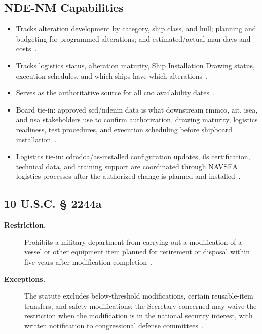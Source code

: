 \documentclass[../main.tex]{subfiles}
\begin{document}
\subsection{NDE-NM Capabilities}
\begin{itemize}
  \item Tracks alteration development by category, ship class, and hull; planning and budgeting for programmed alterations; and estimated/actual man-days and costs~\autocite{edo-4-1-2-navy-modernization-2025,SL720-AA-MAN-030}.
  \item Tracks logistics status, alteration maturity, Ship Installation Drawing status, execution schedules, and which ships have which alterations~\autocite{edo-4-1-2-navy-modernization-2025,SL720-AA-MAN-030,JFMM-VolVI-RevD-Chg5-2025}.
  \item Serves as the authoritative source for all \ac{cno} availability dates~\autocite{edo-4-1-2-navy-modernization-2025,SL720-AA-MAN-030}.
  \item Board tie-in: approved \ac{scd}/\ac{ndenm} data is what downstream \ac{rmmco}, \ac{ait}, \ac{isea}, and
        \ac{nsa} stakeholders use to confirm authorization, drawing maturity, logistics readiness, test procedures, and
        execution scheduling before shipboard installation~\autocite{edo-4-1-2-navy-modernization-2025,SL720-AA-MAN-030,JFMM-VolVI-RevD-Chg5-2025,TS9090-310}.
  \item Logistics tie-in: \ac{cdmdoa}/as-installed configuration updates, \ac{ils} certification, technical data, and
        training support are coordinated through NAVSEA logistics processes after the authorized change is planned and
        installed~\autocite{NAVSEA-Logistics-Planning-Processes-Policy-2026}.
\end{itemize}

\subsection{10 U.S.C. \texorpdfstring{\S}{Section} 2244a}
\begin{description}
  \item[\textbf{Restriction.}] Prohibits a military department from carrying out a modification of a vessel or other equipment item planned for retirement or disposal within five years after modification completion~\autocite{USC-10-2244a,edo-4-1-2-navy-modernization-2025}.
  \item[\textbf{Exceptions.}] The statute excludes below-threshold modifications, certain reusable-item transfers, and safety modifications; the Secretary concerned may waive the restriction when the modification is in the national security interest, with written notification to congressional defense committees~\autocite{USC-10-2244a,edo-4-1-2-navy-modernization-2025}.
\end{description}
\end{document}
